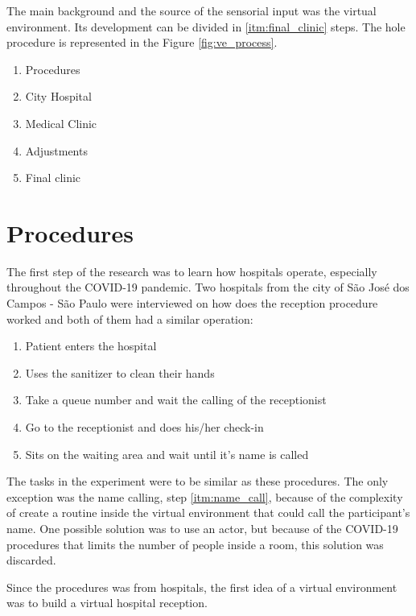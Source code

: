 
The main background and the source of the sensorial input was the virtual environment. Its development can be divided in \ref{itm:final_clinic} steps. The hole procedure is represented in the Figure \ref{fig:ve_process}.

\begin{enumerate}
    \item Procedures
    \item City Hospital
    \item Medical Clinic
    \item Adjustments
    \item Final clinic \label{itm:final_clinic}
\end{enumerate}



\section{Procedures}

    The first step of the research was to learn how hospitals operate, especially throughout the COVID-19 pandemic. Two hospitals from the city of São José dos Campos - São Paulo were interviewed on how does the reception procedure worked and both of them had a similar operation:
    
    \begin{enumerate}
        \item Patient enters the hospital
        \item Uses the sanitizer to clean their hands
        \item Take a queue number and wait the calling of the receptionist
        \item Go to the receptionist and does his/her check-in
        \item Sits on the waiting area and wait until it's name is called \label{itm:name_call}
    \end{enumerate}
    
    The tasks in the experiment were to be similar as these procedures. The only exception was the name calling, step \ref{itm:name_call}, because of the complexity of create a routine inside the virtual environment that could call the participant's name. One possible solution was to use an actor, but because of the COVID-19 procedures that limits the number of people inside a room, this solution was discarded.
    
    Since the procedures was from hospitals, the first idea of a virtual environment was to build a virtual hospital reception.

